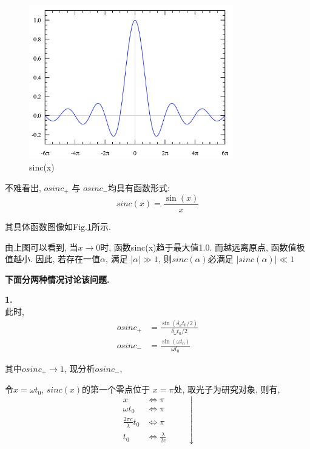 \documentclass[a4paper, 11pt]{article}
\begin{document}
\begin{spacing}{1.2}
        \begin{figure}[H]
          \centering\includegraphics[width=3.5in]{image/sinc.png}
          \caption{sinc(x)}\label{pic_sinc}
        \end{figure} 

        不难看出, $osinc_+$ 与 $osinc_-$均具有函数形式:
        \begin{equation}
          sinc(x) = \frac{\sin(x)}{x}
        \end{equation}

        其具体函数图像如Fig.\ref{pic_sinc}所示.
         
        由上图可以看到, 当$x\to 0$时, 函数sinc(x)趋于最大值1.0. 而越远离原点, 函数值极值越小.
        因此, 若存在一值$\alpha$, 满足 |$\alpha|\gg 1$, 则$sinc(\alpha)$必满足
        $|sinc(\alpha)|\ll 1$

        

        \textbf{下面分两种情况讨论该问题.}
        \par
        
        \textbf{1.}  {}\\
        
        此时, 
        \begin{subequations}
          \begin{align}
            osinc_+ & =  \frac{\sin(\delta_\omega t_0/2)}{\delta_\omega t_0/2}\\
            osinc_- & =  \frac{\sin(\omega t_0)}{\omega t_0}
          \end{align}
        \end{subequations}

        其中$osinc_+ \to 1$, 现分析$osinc_-$,

        \par
        令$x = \omega t_0$, $sinc(x)$的第一个零点位于 $x = \pi$处, 取光子为研究对象, 则有,
        \begin{equation}
          \begin{aligned}
            x & \iff \pi\\
            \omega t_0 & \iff \pi\\
            \frac{2\pi c}{\lambda}t_0 & \iff \pi\\
            t_0  & \iff \frac{\lambda}{2c}
          \end{aligned}
          \qquad\downarrow
        \end{equation}


\end{spacing}
\end{document}
